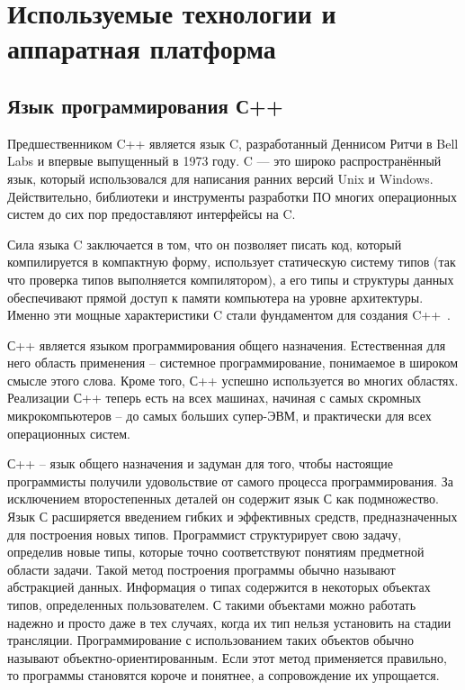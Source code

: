\section{Используемые технологии и аппаратная платформа}


\subsection{Язык программирования С++}

Предшественником C++ является язык C, разработанный Деннисом Ритчи в Bell Labs и впервые выпущенный в 1973 году. C — это широко распространённый язык, который использовался для написания ранних версий Unix и Windows. Действительно, библиотеки и инструменты разработки ПО многих операционных систем до сих пор предоставляют интерфейсы на C.

Сила языка C заключается в том, что он позволяет писать код, который компилируется в компактную форму, использует статическую систему типов (так что проверка типов выполняется компилятором), а его типы и структуры данных обеспечивают прямой доступ к памяти компьютера на уровне архитектуры. Именно эти мощные характеристики C стали фундаментом для создания C++~\cite{Cpp}.

С++ является языком программирования общего назначения. Естественная для него область
применения -- системное программирование, понимаемое в широком смысле этого слова. Кроме того, С++ успешно используется во многих областях. Реализации С++ теперь есть на всех машинах, начиная с самых скромных микрокомпьютеров -- до самых больших супер-ЭВМ, и практически для всех операционных систем.

С++ -- язык общего назначения и задуман для того, чтобы настоящие программисты получили
удовольствие от самого процесса программирования. За исключением второстепенных деталей он содержит язык С как подмножество. Язык С расширяется введением гибких и эффективных средств, предназначенных для построения новых типов. Программист структурирует свою задачу, определив новые типы, которые точно соответствуют понятиям предметной области задачи. Такой метод построения программы обычно называют абстракцией данных. Информация о типах содержится в некоторых объектах типов, определенных пользователем. С такими объектами можно работать надежно и просто даже в тех случаях, когда их тип нельзя установить на стадии трансляции. Программирование с использованием таких объектов обычно называют объектно-ориентированным. Если этот метод применяется правильно, то программы становятся короче и понятнее, а сопровождение их упрощается.

